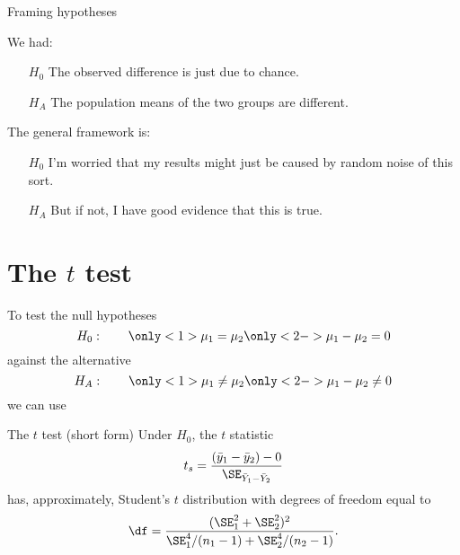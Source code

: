 \begin{frame}{Framing hypotheses}

    We had:
     \begin{itemize}
         \item[$H_0$] The observed difference is just due to chance.
         \item[$H_A$] The population means of the two groups are different.
     \end{itemize}

     \vspace{2em}

    The general framework is:
         \begin{itemize}
             \item[$H_0$] I'm worried that my results might just be caused by random noise of this sort.
             \item[$H_A$] But if not, I have good evidence that this is true.
         \end{itemize}

\end{frame}

\section{The $t$ test}


\begin{frame}{}

    To test the null hypotheses
    \[  H_0: \qquad \only<1>{\mu_1 = \mu_2} \only<2->{\mu_1 - \mu_2 = 0} \]
    against the alternative
    \[  H_A: \qquad \only<1>{\mu_1 \neq \mu_2} \only<2->{\mu_1 - \mu_2 \neq 0} \]
     \pause
     \pause
    we can use

     \vspace{2em}

     \begin{block}{The $t$ test (short form)}
         Under $H_0$, the \alert{$t$ statistic}
         \[ t_s = \frac{ (\bar y_1 - \bar y_2) - 0 }{ \SE_{\bar Y_1 - \bar Y_2} } \]
         has, approximately, \alert{Student's $t$ distribution}
         with degrees of freedom equal to
         \[ \df = \frac{ (\SE_1^2 + \SE_2^2)^2 }{ \SE_1^4/(n_1-1) + \SE_2^4/(n_2-1) } . \]
     \end{block}

\end{frame}

